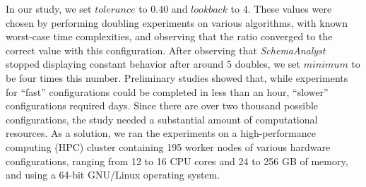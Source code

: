 

In our study, we set $\mathit{tolerance}$ to $0.40$ and $\mathit{lookback}$ to $4$. These values were chosen by
performing doubling experiments on various algorithms, with known worst-case time complexities, and observing that the
ratio converged to the correct value with this configuration.  After observing that \textit{SchemaAnalyst} stopped
displaying constant behavior after around 5 doubles, we set
$\mathit{minimum}$ to be four times this number.
Preliminary studies showed that, while experiments for ``fast'' configurations could be completed in less than an hour,
``slower'' configurations required days.  Since there are over two thousand possible configurations, the study needed
a substantial amount of computational resources.  As a solution, we ran the experiments on a high-performance computing
(HPC) cluster containing 195 worker nodes of various hardware configurations, ranging from 12 to 16 CPU cores and 24 to
256 GB of memory, and using a 64-bit GNU/Linux operating system.


